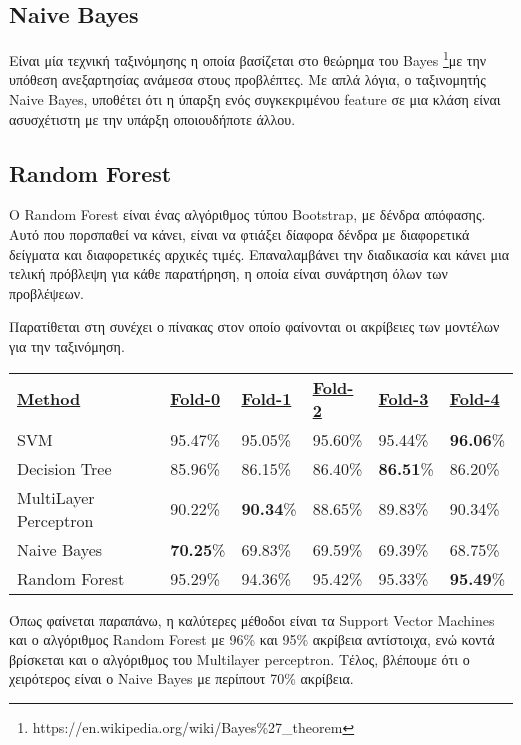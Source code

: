 \subsection{Naive Bayes}

Είναι μία τεχνική ταξινόμησης η οποία βασίζεται στο θεώρημα του Bayes \footnote{https://en.wikipedia.org/wiki/Bayes\%27\_theorem}με την υπόθεση ανεξαρτησίας ανάμεσα στους προβλέπτες. Με απλά λόγια, ο ταξινομητής Naive Bayes, υποθέτει ότι η ύπαρξη ενός συγκεκριμένου feature σε μια κλάση είναι ασυσχέτιστη με την υπάρξη οποιουδήποτε άλλου. 

\subsection{Random Forest}

O Random Forest είναι ένας αλγόριθμος τύπου Bootstrap, με δένδρα απόφασης. Αυτό που πορσπαθεί να κάνει, είναι να φτιάξει δίαφορα δένδρα με διαφορετικά δείγματα και διαφορετικές αρχικές τιμές. Επαναλαμβάνει την διαδικασία και κάνει μια τελική πρόβλεψη για κάθε παρατήρηση, η οποία είναι συνάρτηση όλων των προβλέψεων.

\hfill

Παρατίθεται στη συνέχει ο πίνακας στον οποίο φαίνονται οι ακρίβειες των μοντέλων για την ταξινόμηση.


\begin{table}[h]
\begin{tabular}{llllll}
{\ul \textbf{Method}} & {\ul \textbf{Fold-0}}   & {\ul \textbf{Fold-1}}   & {\ul \textbf{Fold-2}}   & {\ul \textbf{Fold-3}}   & {\ul \textbf{Fold-4}}  \\
SVM                   & 95.47\%                 & 95.05\%                 & 95.60\%                 & 95.44\%                 & \textbf{96.06}\% \\
Decision Tree         & 85.96\%                 & 86.15\%                 & 86.40\%                 & \textbf{86.51}\%        & 86.20\% \\
MultiLayer Perceptron & 90.22\%                 & \textbf{90.34}\%        & 88.65\%                 & 89.83\%                 & 90.34\% \\
Naive Bayes           & \textbf{70.25}\%        & 69.83\%                 & 69.59\%                 & 69.39\%                 & 68.75\% \\
Random Forest         & 95.29\%                 & 94.36\%                 & 95.42\%                 & 95.33\%                 & \textbf{95.49}\%
\end{tabular}
\end{table}

Όπως φαίνεται παραπάνω, η καλύτερες μέθοδοι είναι τα Support Vector Machines και ο αλγόριθμος Random Forest με 96\% και 95\% ακρίβεια αντίστοιχα, ενώ  κοντά βρίσκεται και ο αλγόριθμος του Multilayer perceptron. Τέλος, βλέπουμε ότι ο χειρότερος είναι ο Naive Bayes με περίπουτ 70\% ακρίβεια.
